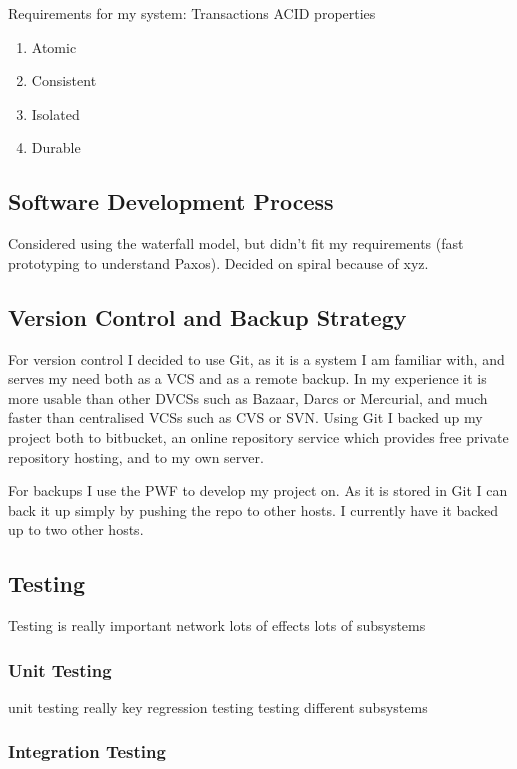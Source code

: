\documentclass[12pt,twoside,notitlepage]{report}
\begin{document}
Requirements for my system:
Transactions
ACID properties
\begin{enumerate}
\item Atomic
\item Consistent
\item Isolated
\item Durable
\end{enumerate}

\subsection{Software Development Process}

Considered using the waterfall model, but didn't fit my requirements (fast prototyping to
understand Paxos). Decided on spiral because of xyz.

\subsection{Version Control and Backup Strategy}

For version control I decided to use Git, as it is a system I am familiar with, and serves my need
both as a VCS and as a remote backup. In my experience it is more usable than other DVCSs such as
Bazaar, Darcs or Mercurial, and much faster than centralised VCSs such as CVS or SVN. Using Git I
backed up my project both to bitbucket, an online repository service which provides free private
repository hosting, and to my own server.

For backups I use the PWF to develop my project on. As it is stored in Git I can back it up simply
by pushing the repo to other hosts. I currently have it backed up to two other hosts.

\subsection{Testing}

Testing is really important
network
lots of effects
lots of subsystems

\subsubsection{Unit Testing}

unit testing really key
regression testing
testing different subsystems

\subsubsection{Integration Testing}
\end{document}
